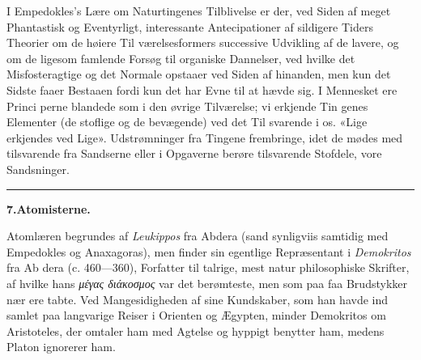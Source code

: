 \documentclass[12pt,a4paper]{book}
\newcommand{\divrule}{\begin{center}\rule{2cm}{0.4pt}\end{center}}
\newcommand{\gk}[1]{\textit{#1}}
\begin{document}
I Empedokles's Lære om Naturtingenes Tilblivelse er der,
ved Siden af meget Phantastisk og Eventyrligt, interessante
Antecipationer af sildigere Tiders Theorier om de høiere Til\-%
værelsesformers successive Udvikling af de lavere, og om de
ligesom famlende Forsøg til organiske Dannelser, ved hvilke
det Misfosteragtige og det Normale opstaaer ved Siden af
hinanden, men kun det Sidste faaer Bestaaen fordi kun
det har Evne til at hævde sig. I Mennesket ere Princi\-%
perne blandede som i den øvrige Tilværelse; vi erkjende Tin\-%
genes Elementer (de stoflige og de bevægende) ved det Til\-%
svarende i os. «Lige erkjendes ved Lige». Udstrømninger
fra Tingene frembringe, idet de mødes med tilsvarende fra
Sandserne eller i Opgaverne berøre tilsvarende Stofdele, vore
Sandsninger.

\divrule

\begin{center}
\textbf{7.\enspace Atomisterne.}
\end{center}
Atomlæren begrundes af \emph{Leukippos} fra Abdera (sand\-%
synligviis samtidig med Empedokles og Anaxagoras), men
finder sin egentlige Repræsentant i \emph{Demokritos} fra Ab\-%
dera (c. 460---360), Forfatter til talrige, mest natur\-%
philosophiske Skrifter, af hvilke hans \gk{μέγας διάκοσμος} var det
berømteste, men som paa faa Brudstykker nær ere tabte. Ved
Mangesidigheden af sine Kundskaber, som han havde ind\-%
samlet paa langvarige Reiser i Orienten og Ægypten, minder
%
%
%
%
Demokritos om Aristoteles, der omtaler ham med Agtelse og
hyppigt benytter ham, medens Platon ignorerer ham.
\end{document}
